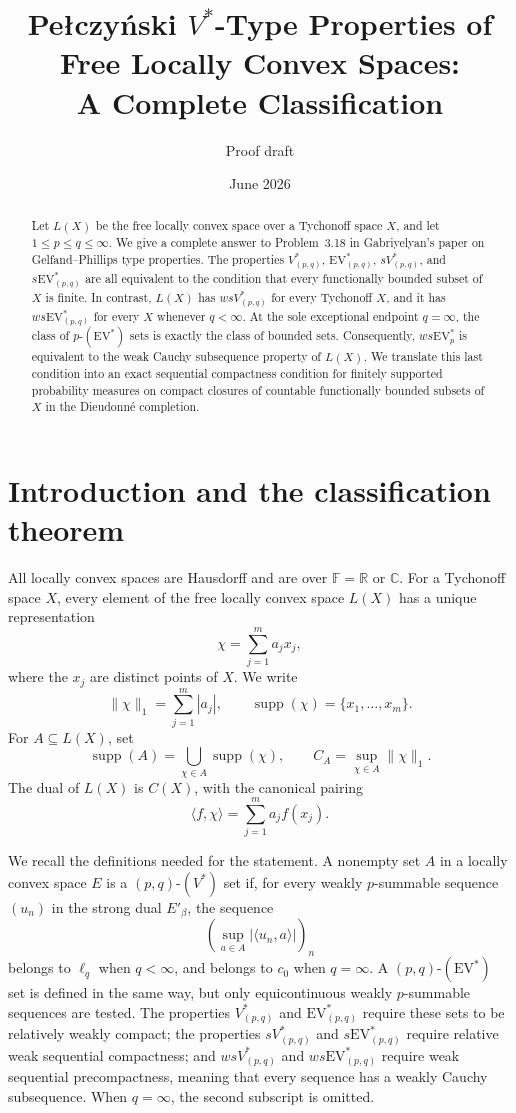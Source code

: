 \documentclass[11pt]{article}
\title{Pe{\l}czy\'nski $V^*$-Type Properties of Free Locally Convex Spaces:\\
A Complete Classification}
\author{Proof draft}
\date{June 2026}
\newcommand{\F}{\mathbb F}
\newcommand{\supp}{\operatorname{supp}}
\newcommand{\EV}{\mathrm{EV}}
\begin{document}
\maketitle

\begin{abstract}
Let $L(X)$ be the free locally convex space over a Tychonoff space $X$, and let
$1\leq p\leq q\leq\infty$.  We give a complete answer to Problem~3.18 in
Gabriyelyan's paper on Gelfand--Phillips type properties\cite{Gabriyelyan2024GP}.  The properties
$V^*_{(p,q)}$, $\EV^*_{(p,q)}$, $sV^*_{(p,q)}$, and $s\EV^*_{(p,q)}$ are all
equivalent to the condition that every functionally bounded subset of $X$ is
finite.  In contrast, $L(X)$ has $wsV^*_{(p,q)}$ for every Tychonoff $X$, and it
has $ws\EV^*_{(p,q)}$ for every $X$ whenever $q<\infty$.  At the sole exceptional
endpoint $q=\infty$, the class of $p$-$(\EV^*)$ sets is exactly the class of
bounded sets.  Consequently, $ws\EV^*_p$ is equivalent to the weak Cauchy
subsequence property of $L(X)$.  We translate this last condition into an exact
sequential compactness condition for finitely supported probability measures on
compact closures of countable functionally bounded subsets of $X$ in the
Dieudonn\'e completion.
\end{abstract}

\section{Introduction and the classification theorem}

All locally convex spaces are Hausdorff and are over $\F=\mathbb R$ or
$\mathbb C$.  For a Tychonoff space $X$, every element of the free locally
convex space $L(X)$ has a unique representation
\[
  \chi=\sum_{j=1}^m a_jx_j,
\]
where the $x_j$ are distinct points of $X$.  We write
\[
  \|\chi\|_1=\sum_{j=1}^m |a_j|,
  \qquad
  \supp(\chi)=\{x_1,\dots,x_m\}.
\]
For $A\subseteq L(X)$, set
\[
  \supp(A)=\bigcup_{\chi\in A}\supp(\chi),
  \qquad
  C_A=\sup_{\chi\in A}\|\chi\|_1.
\]
The dual of $L(X)$ is $C(X)$, with the canonical pairing
\[
  \langle f,\chi\rangle=\sum_{j=1}^m a_jf(x_j).
\]

We recall the definitions needed for the statement.  A nonempty set $A$ in a
locally convex space $E$ is a $(p,q)$-$(V^*)$ set if, for every weakly
$p$-summable sequence $(u_n)$ in the strong dual $E'_\beta$, the sequence
\[
  \left(\sup_{a\in A}|\langle u_n,a\rangle|\right)_n
\]
belongs to $\ell_q$ when $q<\infty$, and belongs to $c_0$ when $q=\infty$.
A $(p,q)$-$(\EV^*)$ set is defined in the same way, but only equicontinuous
weakly $p$-summable sequences are tested.  The properties $V^*_{(p,q)}$ and
$\EV^*_{(p,q)}$ require these sets to be relatively weakly compact; the
properties $sV^*_{(p,q)}$ and $s\EV^*_{(p,q)}$ require relative weak sequential
compactness; and $wsV^*_{(p,q)}$ and $ws\EV^*_{(p,q)}$ require weak sequential
precompactness, meaning that every sequence has a weakly Cauchy subsequence.
When $q=\infty$, the second subscript is omitted.
\end{document}
